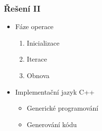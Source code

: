 \documentclass[10pt,xcolor=pdflatex, notes=only]{beamer}
\begin{document}
\begin{frame}
	\frametitle{Řešení II}
	\begin{itemize}
		\item Fáze operace 
		\begin{enumerate}
			\item Inicializace
			\item Iterace
			\item Obnova
		\end{enumerate}
		\item Implementační jazyk C++
		\begin{itemize}
			\item Generické programování
			\item Generování kódu
		\end{itemize}
	\end{itemize}
	\vfill
	\begin{center}
	\end{center}
	\vfill
\end{frame}
\end{document}

